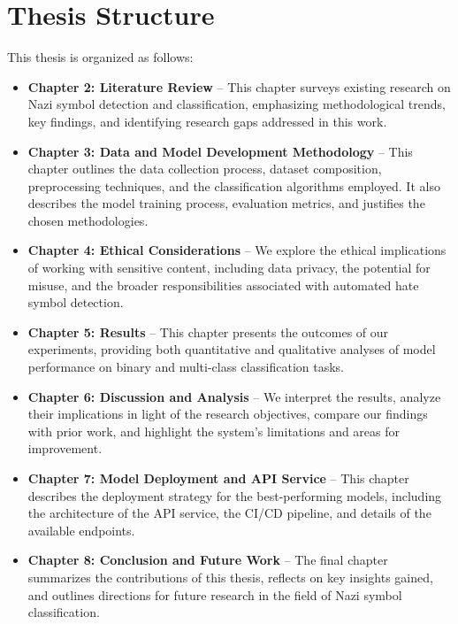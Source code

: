 
\chapter{Thesis Structure}\label{chapter:thesis-structure}

This thesis is organized as follows:

\begin{itemize}
  \item \textbf{Chapter 2: Literature Review} – This chapter surveys existing research on Nazi symbol detection and
  classification, emphasizing methodological trends, key findings, and identifying research gaps addressed in this work.

  \item \textbf{Chapter 3: Data and Model Development Methodology} – This chapter outlines the data collection
  process, dataset composition, preprocessing techniques, and the classification algorithms employed. It also
  describes the model training process, evaluation metrics, and justifies the chosen methodologies.

  \item \textbf{Chapter 4: Ethical Considerations} – We explore the ethical implications of working with sensitive
  content, including data privacy, the potential for misuse, and the broader responsibilities associated with
  automated hate symbol detection.

  \item \textbf{Chapter 5: Results} – This chapter presents the outcomes of our experiments, providing both
  quantitative and qualitative analyses of model performance on binary and multi-class classification tasks.

  \item \textbf{Chapter 6: Discussion and Analysis} – We interpret the results, analyze their implications in light
  of the research objectives, compare our findings with prior work, and highlight the system's limitations and areas
  for improvement.

  \item \textbf{Chapter 7: Model Deployment and \ac{API} Service} – This chapter describes the deployment strategy
  for the best-performing models, including the architecture of the \ac{API} service, the \ac{CI/CD} pipeline, and
  details of the available endpoints.

  \item \textbf{Chapter 8: Conclusion and Future Work} – The final chapter summarizes the contributions of this
  thesis, reflects on key insights gained, and outlines directions for future research in the field of Nazi symbol
  classification.
\end{itemize}